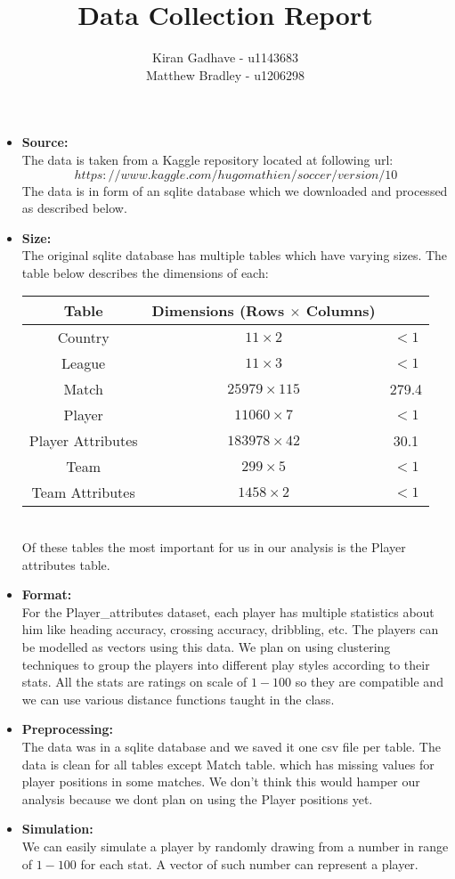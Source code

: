 \documentclass[11pt]{extarticle}
\title{Data Collection Report}
\author{Kiran Gadhave - u1143683\\Matthew Bradley - u1206298}
\newcommand{\<}{\langle}
\renewcommand{\>}{\rangle}
\theoremstyle{definition}
\begin{document}
\maketitle

\begin{itemize}

	\item \textbf{Source:}\\
	The data is taken from a Kaggle repository located at following url: 
	$$https://www.kaggle.com/hugomathien/soccer/version/10 $$
	The data is in form of an sqlite database which we downloaded and processed as described below.
	\item \textbf{Size:}\\
	The original sqlite database has multiple tables which have varying sizes. The table below describes the dimensions of each:
	\begin{table}[h!]
		\begin{center}
			\begin{tabular}{c|c c}
				\textbf{Table} & \textbf{Dimensions (Rows $\times$ Columns)} & \textbf{File Size (Mb) \\
				\hline
				Country & $11 \times 2$ & $<1$\\
				League & $11 \times 3$ & $<1$\\
				Match & $25979 \times 115$ & 279.4\\
				Player & $11060 \times 7$ & $<1$\\
				Player Attributes & $183978 \times 42$ & 30.1\\
				Team & $299 \times 5$ & $<1$\\
				Team Attributes & $1458 \times 2$ & $<1$\\
			\end{tabular}
		\end{center}
	\end{table}
	\\
	Of these tables the most important for us in our analysis is the Player attributes table.
	\item \textbf{Format:}\\
	For the Player\_attributes dataset, each player has multiple statistics about him like heading accuracy, crossing accuracy, dribbling, etc. The players can be modelled as vectors using this data. We plan on using clustering techniques to group the players into different play styles according to their stats. All the stats are ratings on scale of $1-100$ so they are compatible and we can use various distance functions taught in the class.
	\item \textbf{Preprocessing:}\\
	The data was in a sqlite database and we saved it one csv file per table. The data is clean for all tables except Match table. which has missing values for player positions in some matches. We don't think this would hamper our analysis because we dont plan on using the Player positions yet.
	\item \textbf{Simulation:}\\
	We can easily simulate a player by randomly drawing from a number in range of $1-100$ for each stat. A vector of such number can represent a player.
\end{itemize}
\end{document}
